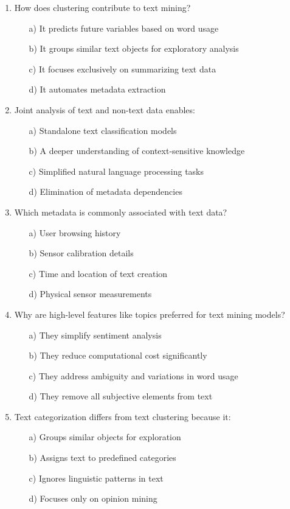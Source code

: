 \documentclass[8pt]{extarticle}
\begin{document}
\begin{multicols}{2}
\begin{enumerate}
\item How does clustering contribute to text mining?
\begin{itemize}
\item[a)] It predicts future variables based on word usage
\item[b)] It groups similar text objects for exploratory analysis
\item[c)] It focuses exclusively on summarizing text data
\item[d)] It automates metadata extraction
\end{itemize}

\item Joint analysis of text and non-text data enables:
\begin{itemize}
\item[a)] Standalone text classification models
\item[b)] A deeper understanding of context-sensitive knowledge
\item[c)] Simplified natural language processing tasks
\item[d)] Elimination of metadata dependencies
\end{itemize}

\item Which metadata is commonly associated with text data?
\begin{itemize}
\item[a)] User browsing history
\item[b)] Sensor calibration details
\item[c)] Time and location of text creation
\item[d)] Physical sensor measurements
\end{itemize}

\item Why are high-level features like topics preferred for text mining models?
\begin{itemize}
\item[a)] They simplify sentiment analysis
\item[b)] They reduce computational cost significantly
\item[c)] They address ambiguity and variations in word usage
\item[d)] They remove all subjective elements from text
\end{itemize}

\item Text categorization differs from text clustering because it:
\begin{itemize}
\item[a)] Groups similar objects for exploration
\item[b)] Assigns text to predefined categories
\item[c)] Ignores linguistic patterns in text
\item[d)] Focuses only on opinion mining
\end{itemize}


\end{enumerate}
\end{multicols}
\end{document}
